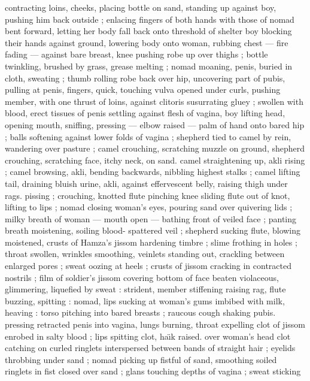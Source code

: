 contracting loins, cheeks, placing bottle on sand, standing up against 
boy, pushing him back outside ; enlacing fingers of both hands with 
those of nomad bent forward, letting her body fall back onto 
threshold of shelter {\col} boy blocking their hands against ground, 
lowering body onto woman, rubbing chest --- fire fading --- against 
bare breast, knee pushing robe up over thighs ; bottle twinkling, 
brushed by grass, grease melting ; nomad moaning, penis, buried in 
cloth, sweating ; thumb rolling robe back over hip, uncovering part of 
pubis, pulling at penis, fingers, quick, touching vulva opened under 
curls, pushing member, with one thrust of loins, against clitoris 
susurrating gluey ; swollen with blood, erect tissues of penis settling 
against flesh of vagina, boy lifting head, opening mouth, sniffing, 
pressing --- elbow raised --- palm of hand onto bared hip ; balls 
softening against lower folds of vagina ; shepherd tied to camel by 
rein, wandering over pasture ; camel crouching, scratching muzzle on 
ground, shepherd crouching, scratching face, itchy neck, on sand. 
camel straightening up, akli rising ; camel browsing, akli, bending 
backwards, nibbling highest stalks ; camel lifting tail, draining bluish 
urine, akli, against effervescent belly, raising thigh under rags. 
pissing ; crouching, knotted flute pinching knee {\col} sliding flute out of 
knot, lifting to lips ; nomad closing woman's eyes, pouring sand over 
quivering lids ; milky breath of woman --- mouth open --- bathing 
front of veiled face ; panting breath moistening, soiling blood- 
spattered veil ; shepherd sucking flute, blowing {\col} moistened, crusts 
of Hamza's jissom hardening timbre ; slime frothing in holes ; throat 
swollen, wrinkles smoothing, veinlets standing out, crackling 
between enlarged pores ; sweat oozing at heels ; crusts of jissom 
cracking in contracted nostrils ; film of soldier's jissom covering 
bottom of face beaten violaceous, glimmering, liquefied by sweat : 
strident, member stiffening raising rag, flute buzzing, spitting : 
nomad, lips sucking at woman's gums imbibed with milk, heaving : 
torso pitching into bared breasts ; raucous cough shaking pubis. 
pressing retracted penis into vagina, lungs burning, throat expelling 
clot of jissom enrobed in salty blood ; lips spitting clot, ha\"{\i}k raised. 
over woman's head {\col} clot catching on curled ringlets interspersed 
between bands of straight hair ; eyelids throbbing under sand ; 
nomad picking up fistful of sand, smoothing soiled ringlets in fist 
closed over sand ; glans touching depths of vagina ; sweat sticking 
